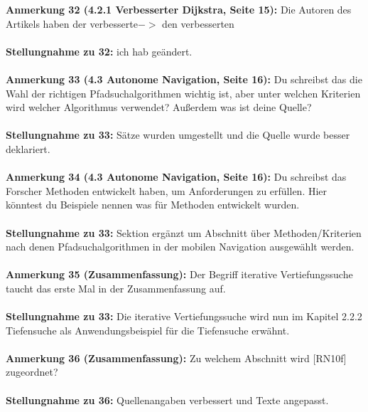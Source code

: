 \documentclass[a4paper,12pt]{book}
\begin{document}
\textbf{Anmerkung 32 (4.2.1 Verbesserter Dijkstra, Seite 15):}
\glqq Die Autoren des Artikels haben der verbesserte\grqq $->$ den verbesserten
 \\  \\
\textbf{Stellungnahme zu 32:} ich hab geändert.
\\ \\
\textbf{Anmerkung 33 (4.3 Autonome Navigation, Seite 16):}
Du schreibst das die Wahl der richtigen Pfadsuchalgorithmen wichtig ist, aber unter welchen Kriterien wird welcher Algorithmus verwendet? 
Außerdem was ist deine Quelle?
\\ \\
\textbf{Stellungnahme zu 33:}
Sätze wurden umgestellt und die Quelle wurde besser deklariert.
\\ \\
\textbf{Anmerkung 34 (4.3 Autonome Navigation, Seite 16):}
Du schreibst das Forscher Methoden entwickelt haben, um Anforderungen zu erfüllen. Hier könntest du Beispiele nennen was für Methoden entwickelt wurden. 
\\ \\
\textbf{Stellungnahme zu 33:}
Sektion ergänzt um Abschnitt über Methoden/Kriterien nach denen Pfadsuchalgorithmen in der mobilen Navigation ausgewählt werden.
\\ \\
\textbf{Anmerkung 35 (Zusammenfassung):}
Der Begriff iterative Vertiefungssuche taucht das erste Mal in der Zusammenfassung auf. 
\\ \\
\textbf{Stellungnahme zu 33:}
Die iterative Vertiefungssuche wird nun im Kapitel 2.2.2 Tiefensuche als Anwendungsbeispiel für die Tiefensuche erwähnt.
\\ \\
\textbf{Anmerkung 36 (Zusammenfassung):}
Zu welchem Abschnitt wird [RN10f] zugeordnet?
\\ \\
\textbf{Stellungnahme zu 36:}
Quellenangaben verbessert und Texte  angepasst.
\\ \\
\end{document}
